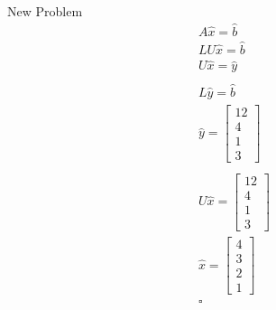 \documentclass[10pt,a4paper]{article}
\begin{document}
	New Problem
	\begin{align*}
	A\hat{x} = \hat{b}\\
	LU\hat{x} = \hat{b}\\
	U\hat{x} = \hat{y}\\
	\\
	L\hat{y} = \hat{b}\\
	\hat{y} = \begin{bmatrix}12 \\ 4  \\ 1 \\ 3 \end{bmatrix}\\
	\\
	U\hat{x} = \begin{bmatrix}12 \\ 4  \\ 1 \\ 3 \end{bmatrix}\\
	\hat{x} = \begin{bmatrix}4\\3\\2\\1\end{bmatrix}\\
	\square
	\end{align*}
\end{document}
